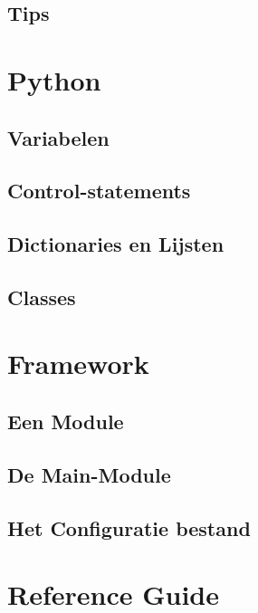 \documentclass[a4paper, twoside]{article}
\begin{document}
\subsection{Tips}

\appendix

\cleardoublepage
\section{Python}
\subsection{Variabelen}
\subsection{Control-statements}
\subsection{Dictionaries en Lijsten}
\subsection{Classes}

\cleardoublepage
\section{Framework}
\subsection{Een Module}
\subsection{De Main-Module}
\subsection{Het Configuratie bestand}

\cleardoublepage
\section{Reference Guide}
\end{document}
